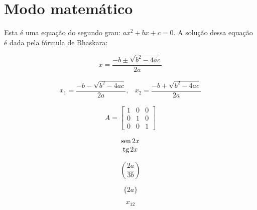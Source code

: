 \documentclass[12pt]{report}
\renewcommand{\sin}{\mathrm{sen\hspace{0.5mm}}} %
\renewcommand{\tan}{\mathrm{tg\hspace{0.5mm}}} %
\begin{document}

\section{Modo matemático}

Esta é uma equação do segundo grau: $ax^2 + bx + c = 0$. %
A solução dessa equação é dada pela fórmula de Bhaskara:

\begin{equation} %
    x = \frac{-b \pm \sqrt{b^2 - 4ac}}{2a}
\end{equation}

\begin{equation*} %
    \begin{array}{cc}
        x_1 = \dfrac{-b - \sqrt{b^2 - 4ac}}{2a}, &
        x_2 = \dfrac{-b + \sqrt{b^2 - 4ac}}{2a}
    \end{array}
\end{equation*}

\begin{equation*}
    A =
    \begin{bmatrix}
        1 & 0 & 0 \\
        0 & 1 & 0 \\
        0 & 0 & 1
    \end{bmatrix}
\end{equation*}

\begin{equation*}
    \begin{matrix}
        \sin{2x} \\
        \tan{2x}
    \end{matrix}
\end{equation*}

\begin{equation*}
    \left(\frac{2a}{3b}\right)
\end{equation*}

\begin{equation*}
    \{2a\}
\end{equation*}

\begin{equation*}
    x_{12}
\end{equation*}
\end{document}
